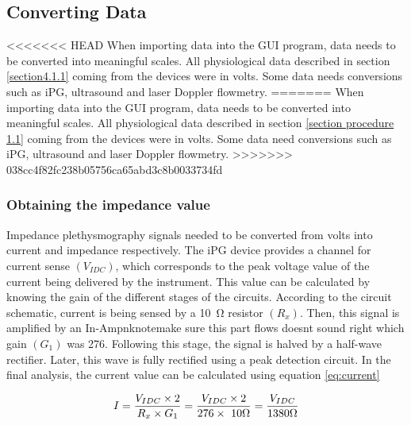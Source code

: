 \subsection{Converting Data}
\label{section procedure 2.1}

<<<<<<< HEAD
When importing data into the GUI program, data needs to be converted into meaningful scales. All physiological data described in section \ref{section4.1.1} coming from the devices were in volts. Some data needs conversions such as iPG, ultrasound and laser Doppler flowmetry.
=======
When importing data into the GUI program, data needs to be converted into meaningful scales. All physiological data described in section \ref{section procedure 1.1} coming from the devices were in volts. Some data need conversions such as iPG, ultrasound and laser Doppler flowmetry.
>>>>>>> 038cc4f82fc238b05756ca65abd3c8b0033734fd


\subsubsection{Obtaining the impedance value}
Impedance plethysmography signals needed to be converted from volts into current and impedance respectively. The iPG device provides a channel for current sense $(V_{IDC})$, which corresponds to the peak voltage value of the current being delivered by the instrument. This value can be calculated by knowing the gain of the different stages of the circuits. According to the circuit schematic, current is being sensed by a \SI{10}{\ohm} resistor $(R_x)$. Then, this signal is amplified by an In-Ampnknote{make sure this part flows doesnt sound right} which gain $(G_1)$ was 276. Following this stage, the signal is halved by a half-wave rectifier. Later, this wave is fully rectified using a peak detection circuit. In the final analysis, the current value can be calculated using equation \ref{eq:current}

\begin{align}
	\label{eq:current}
	I = \frac{V_{IDC} \times 2}{R_x \times G_1} = \frac{V_{IDC} \times 2}{276 \times\ 10 \Omega} = \frac{V_{IDC}}{1380 \Omega} \tagaddtext{[\si{\ampere}]}
\end{align}

